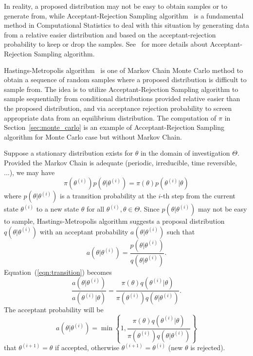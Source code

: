 In reality, a proposed distribution may not be easy to obtain samples or
to generate from, while Acceptant-Rejection Sampling
algorithm~ is a fundamental
method in Computational Statistics to deal with this situation by generating
data from a relative easier distribution and based on the acceptant-rejection
probability to keep or drop the samples. See~\citet{Ross1996} for more details
about Acceptant-Rejection Sampling algorithm.

Hastings-Metropolis algorithm~\citep{Hastings1970,Metropolis1953}
is one of Markov Chain Monte Carlo method to obtain
a sequence of random samples where a proposed distribution is difficult to
sample from. The idea is to utilize Acceptant-Rejection Sampling algorithm
to sample sequentially from conditional distributions provided relative
easier than the proposed distribution, and via acceptance rejection
probability to screen appropriate data from an equilibrium distribution.
The computation of $\pi$ in Section~\ref{sec:monte_carlo}
is an example of Acceptant-Rejection Sampling algorithm for
Monte Carlo case but without Markov Chain.

Suppose a stationary distribution exists for $\theta$ in the domain of
investigation $\Theta$. Provided the Markov Chain is adequate
(periodic, irreducible, time reversible, ...), we may have
\begin{equation}
\pi(\theta^{(i)}) p(\theta | \theta^{(i)}) =
\pi(\theta) p(\theta^{(i)} | \theta)
\label{eqn:transition}
\end{equation}
where $p(\theta | \theta^{(i)})$ is a transition probability at the $i$-th step
from the current state $\theta^{(i)}$ to a new state $\theta$ for all
$\theta^{(i)}, \theta \in \Theta$.
Since $p(\theta | \theta^{(i)})$ may not be easy to sample, Hastings-Metropolis
algorithm suggests a proposal distribution $q(\theta | \theta^{(i)})$ with an
acceptant probability $a(\theta | \theta^{(i)})$ such that
\begin{equation}
a(\theta | \theta^{(i)}) =
\frac{p(\theta | \theta^{(i)})}{q(\theta | \theta^{(i)})}.
\label{eqn:accpetance}
\end{equation}
Equation~(\ref{eqn:transition}) becomes
\begin{equation}
\frac{a(\theta | \theta^{(i)})}{a(\theta^{(i)} | \theta)}
=
\frac{\pi(\theta) q(\theta^{(i)} | \theta)}{
      \pi(\theta^{(i)}) q(\theta | \theta^{(i)})}.
\label{eqn:acceptant_rejection}
\end{equation}
The acceptant probability will be
\begin{equation}
a(\theta | \theta^{(i)}) = \min \left\{
1,
\frac{\pi(\theta) q(\theta^{(i)} | \theta)}{
      \pi(\theta^{(i)}) q(\theta | \theta^{(i)})}
\right\}
\label{eqn:acceptant_probability}
\end{equation}
that
$\theta^{(i+1)} = \theta$ if accepted, otherwise
$\theta^{(i+1)} = \theta^{(i)}$ (new $\theta$ is rejected).

